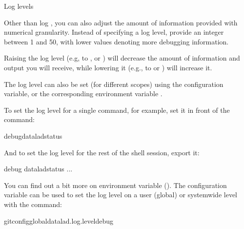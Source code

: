 \begin{findoutmore}[label={fom-loglevels}, before title={\thetcbcounter\ }, float, floatplacement=tbp, check odd page=true]{Log levels}
\begin{itemize}
\end{itemize}

\sphinxAtStartPar
Other than log , you can also adjust the amount of information provided with numerical granularity. Instead of specifying a log level, provide an integer between 1 and 50, with lower values denoting more debugging information.

\sphinxAtStartPar
Raising the log level (e.g, to , or ) will decrease the amount of information and output you will receive, while lowering it (e.g., to  or ) will increase it.

\bigskip

\sphinxAtStartPar
{}

\medskip

\sphinxAtStartPar
The log level can also be set (for different scopes) using the  configuration variable, or the corresponding environment variable .

\sphinxAtStartPar
To set the log level for a single command, for example, set it in front of the command:

\begin{sphinxVerbatim}[commandchars=\\\{\}]
debugdataladstatus
\end{sphinxVerbatim}

\sphinxAtStartPar
And to set the log level for the rest of the shell session, export it:

\begin{sphinxVerbatim}[commandchars=\\\{\}]
debug
dataladstatus
...
\end{sphinxVerbatim}

\sphinxAtStartPar
You can find out a bit more on environment variable {\hyperref[\detokenize{basics/101-123-config2:fom-envvar}]{}} ().
The configuration variable can be used to set the log level on a user (global) or system\sphinxhyphen{}wide level with the  command:

\begin{sphinxVerbatim}[commandchars=\\\{\}]
gitconfig\PYGZhy{}\PYGZhy{}globaldatalad.log.leveldebug
\end{sphinxVerbatim}


\end{findoutmore}

